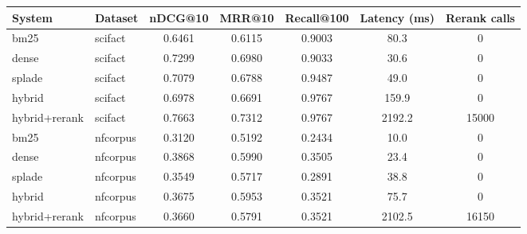 \begin{tabular}{llccccc}
\toprule
System & Dataset & nDCG@10 & MRR@10 & Recall@100 & Latency (ms) & Rerank calls \\
\midrule
bm25 & scifact & 0.6461 & 0.6115 & 0.9003 & 80.3 & 0 \\
dense & scifact & 0.7299 & 0.6980 & 0.9033 & 30.6 & 0 \\
splade & scifact & 0.7079 & 0.6788 & 0.9487 & 49.0 & 0 \\
hybrid & scifact & 0.6978 & 0.6691 & 0.9767 & 159.9 & 0 \\
hybrid+rerank & scifact & 0.7663 & 0.7312 & 0.9767 & 2192.2 & 15000 \\
bm25 & nfcorpus & 0.3120 & 0.5192 & 0.2434 & 10.0 & 0 \\
dense & nfcorpus & 0.3868 & 0.5990 & 0.3505 & 23.4 & 0 \\
splade & nfcorpus & 0.3549 & 0.5717 & 0.2891 & 38.8 & 0 \\
hybrid & nfcorpus & 0.3675 & 0.5953 & 0.3521 & 75.7 & 0 \\
hybrid+rerank & nfcorpus & 0.3660 & 0.5791 & 0.3521 & 2102.5 & 16150 \\
\bottomrule
\end{tabular}

